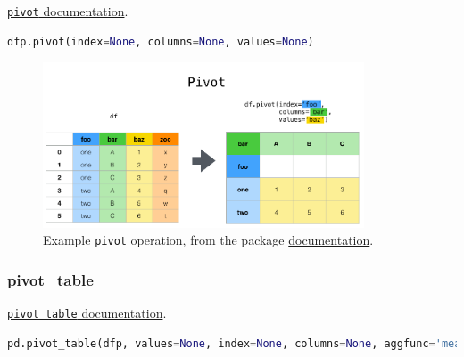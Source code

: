 \noindent \href{http://pandas.pydata.org/pandas-docs/stable/reference/api/pandas.DataFrame.pivot.html}{\texttt{pivot} documentation}.

\begin{lstlisting}[language=Python]
dfp.pivot(index=None, columns=None, values=None)
\end{lstlisting}

\begin{figure}[H]
\centering
\includegraphics[width=0.85\textwidth]{figures/pandas/reshaping_pivot.png}
\caption{
Example \pandas \texttt{pivot} operation, from the package \href{http://pandas.pydata.org/pandas-docs/stable/user_guide/reshaping.html}{documentation}.
}
\label{fig:pandas:pivot}
\end{figure}

\subsubsection{pivot\_table}
\label{pandas:pivoting:pivot_table}

\noindent \href{https://pandas.pydata.org/pandas-docs/stable/reference/api/pandas.pivot_table.html}{\texttt{pivot\_table} documentation}.

\begin{lstlisting}[language=Python]
pd.pivot_table(dfp, values=None, index=None, columns=None, aggfunc='mean', fill_value=None, margins=False, dropna=True, margins_name='All')
\end{lstlisting}

